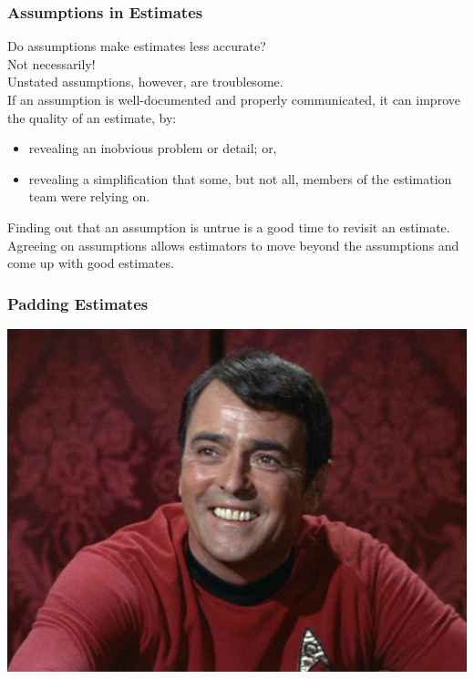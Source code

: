 \begin{frame}
\frametitle{Assumptions in Estimates}

\begin{changemargin}{1cm}

Do assumptions make estimates less accurate? \\
\hspace*{3em}\alert{Not necessarily!}\\
Unstated assumptions, however, are troublesome.\\[1em]

If an assumption is well-documented and properly communicated, it can
improve the quality of an estimate, by:
\begin{itemize}
\item revealing an inobvious problem or detail; or,
\item revealing a simplification that some, but not all, members of the estimation team were relying on.
\end{itemize}


Finding out that an assumption is untrue is a good time to revisit an estimate.\\[1em]

Agreeing on assumptions allows estimators to
move beyond the assumptions and come up with good estimates.

\end{changemargin}
\end{frame}


\begin{frame}
\frametitle{Padding Estimates}

\begin{center}
\includegraphics[width=.75\textwidth]{images/scotty.jpg}
\end{center}

\end{frame}

